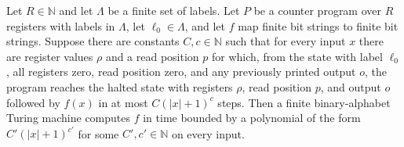 \begin{theorem}
\label{Complexity.CounterProg.polyTimeComputable_of_goes}
\leanok
{}
Let $R\in\mathbb{N}$ and let $\Lambda$ be a finite set of labels. Let $P$ be a counter
program over $R$ registers with labels in $\Lambda$, let $\ell_0\in\Lambda$, and let $f$
map finite bit strings to finite bit strings. Suppose there are constants
$C,c\in\mathbb{N}$ such that for every input $x$ there are register values $\rho$ and a
read position $p$ for which, from the state with label $\ell_0$, all registers zero,
read position zero, and any previously printed output $o$, the program reaches the
halted state with registers $\rho$, read position $p$, and output $o$ followed by $f(x)$
in at most $C(|x|+1)^c$ steps. Then a finite binary-alphabet Turing machine computes $f$
in time bounded by a polynomial of the form $C'(|x|+1)^{c'}$ for some
$C',c'\in\mathbb{N}$ on every input.
\end{theorem}
